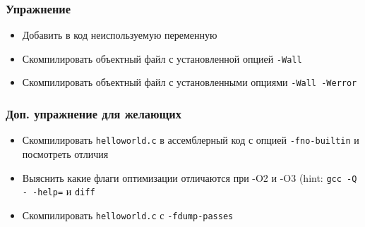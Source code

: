 \begin{frame}
	\frametitle{Упражнение}
	\begin{itemize}
		\item Добавить в код неиспользуемую переменную
		\item Скомпилировать объектный файл с установленной опцией {\tt -Wall}
		\item Скомпилировать объектный файл с установленными опциями {\tt -Wall -Werror}
	\end{itemize}
\end{frame}

\begin{frame}
  \frametitle{Доп. упражнение для желающих}
  \begin{itemize}
    \item Скомпилировать \texttt{helloworld.c} в ассемблерный код с опцией \texttt{-fno-builtin} и посмотреть отличия
    \item Выяснить какие флаги оптимизации отличаются при -O2 и -O3 (hint: \texttt{gcc -Q - -help=} и \texttt{diff}
    \item Скомпилировать \texttt{helloworld.c} с \texttt{-fdump-passes}
  \end{itemize}
\end{frame}

